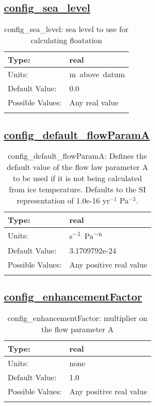 \subsection[config\_sea\_level]{\hyperref[sec:nm_tab_physical_parameters]{config\_sea\_level}}
\label{subsec:nm_sec_config_sea_level}
\begin{center}
\begin{longtable}{| p{2.0in} || p{4.0in} |}
    \hline
    Type: & real \\
    \hline
    Units: & \si{m.above.datum} \\
    \hline
    Default Value: & 0.0 \\
    \hline
    Possible Values: & Any real value \\
    \hline
    \caption{config\_sea\_level: sea level to use for calculating floatation}
\end{longtable}
\end{center}
\subsection[config\_default\_flowParamA]{\hyperref[sec:nm_tab_physical_parameters]{config\_default\_flowParamA}}
\label{subsec:nm_sec_config_default_flowParamA}
\begin{center}
\begin{longtable}{| p{2.0in} || p{4.0in} |}
    \hline
    Type: & real \\
    \hline
    Units: & \si{s^{-1}.Pa^{-n}} \\
    \hline
    Default Value: & 3.1709792e-24 \\
    \hline
    Possible Values: & Any positive real value \\
    \hline
    \caption{config\_default\_flowParamA: Defines the default value of the flow law parameter A to be used if it is not being calculated from ice temperature.  Defaults to the SI representation of 1.0e-16 yr$^{-1}$ Pa$^{-3}$.}
\end{longtable}
\end{center}
\subsection[config\_enhancementFactor]{\hyperref[sec:nm_tab_physical_parameters]{config\_enhancementFactor}}
\label{subsec:nm_sec_config_enhancementFactor}
\begin{center}
\begin{longtable}{| p{2.0in} || p{4.0in} |}
    \hline
    Type: & real \\
    \hline
    Units: & \si{none} \\
    \hline
    Default Value: & 1.0 \\
    \hline
    Possible Values: & Any positive real value \\
    \hline
    \caption{config\_enhancementFactor: multiplier on the flow parameter A}
\end{longtable}
\end{center}
